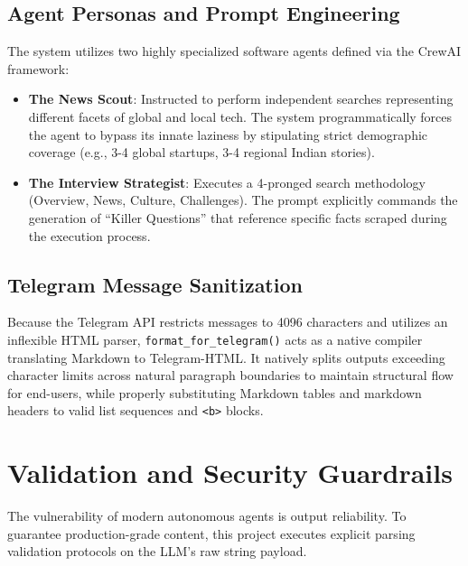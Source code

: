 \documentclass[conference]{IEEEtran}
\begin{document}
\subsection{Agent Personas and Prompt Engineering}
The system utilizes two highly specialized software agents defined via the CrewAI framework:
\begin{itemize}
    \item \textbf{The News Scout}: Instructed to perform independent searches representing different facets of global and local tech. The system programmatically forces the agent to bypass its innate laziness by stipulating strict demographic coverage (e.g., 3-4 global startups, 3-4 regional Indian stories).
    \item \textbf{The Interview Strategist}: Executes a 4-pronged search methodology (Overview, News, Culture, Challenges). The prompt explicitly commands the generation of ``Killer Questions'' that reference specific facts scraped during the execution process.
\end{itemize}

\subsection{Telegram Message Sanitization}
Because the Telegram API restricts messages to 4096 characters and utilizes an inflexible HTML parser, \texttt{format\_for\_telegram()} acts as a native compiler translating Markdown to Telegram-HTML. It natively splits outputs exceeding character limits across natural paragraph boundaries to maintain structural flow for end-users, while properly substituting Markdown tables and markdown headers to valid list sequences and \verb|<b>| blocks.

\section{Validation and Security Guardrails}

The vulnerability of modern autonomous agents is output reliability. To guarantee production-grade content, this project executes explicit parsing validation protocols on the LLM's raw string payload.
\end{document}
